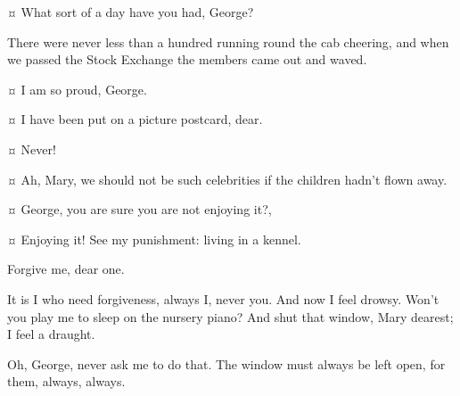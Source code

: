 \begin{drama}
\mrsdarlingspeaks {}¤
What sort of a day have you had, George?


\mrdarlingspeaks
There were never less than a hundred running round the cab cheering,
and when we passed the Stock Exchange the members came out and waved.


\mrsdarlingspeaks {}¤
I am so proud, George.

\mrdarlingspeaks {}¤
I have been put on a picture postcard, dear.

\mrsdarlingspeaks {}¤
Never!

\mrdarlingspeaks {}¤
Ah, Mary, we should not be such celebrities if the children hadn't flown away.

\mrsdarlingspeaks {}¤
George, you are sure you are not enjoying it?,

\mrdarlingspeaks {}¤
Enjoying it!
See my punishment: living in a kennel.

\mrsdarlingspeaks
Forgive me, dear one.

\mrdarlingspeaks
It is I who need forgiveness, always I, never you.
And now I feel drowsy.
Won't you play me to sleep on the nursery piano?
And shut that window, Mary dearest; I feel a draught.

\mrsdarlingspeaks
Oh, George, never ask me to do that.
The window must always be left open, for them, always, always.



\end{drama}
